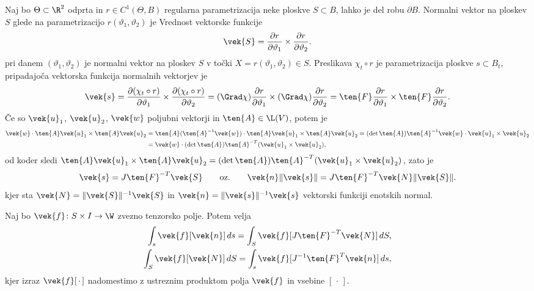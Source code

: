 Naj bo $\Theta\subset\R^2$ odprta in $r\in C^1(\Theta,B)$ regularna parametrizacija
neke ploskve $S\subset B$, lahko je del robu $\partial B$. Normalni vektor
na ploskev $S$ glede na parametrizacijo $r(\vartheta_1,\vartheta_2)$ je
Vrednost vektorske funkcije
\[
	\vek{S}=\frac{\partial r}{\partial\vartheta_1}\times
	\frac{\partial r}{\partial\vartheta_2}.
\]
pri danem $(\vartheta_1,\vartheta_2)$ je normalni vektor na ploskev $S$
v točki $X=r(\vartheta_1,\vartheta_2)\in S$.
Preslikava $\chi_t\circ r$ je parametrizacija ploskve $s\subset B_t$, pripadajoča
vektorska funkcija normalnih vektorjev je
\[
	\vek{s}=\frac{\partial(\chi_t\circ r)}{\partial\vartheta_1}\times
	\frac{\partial(\chi_t\circ r)}{\partial\vartheta_2}=
	(\Grad\chi)\frac{\partial r}{\partial\vartheta_1}\times
	(\Grad\chi)\frac{\partial r}{\partial\vartheta_2}=
	\ten{F}\frac{\partial r}{\partial\vartheta_1}\times
	\ten{F}\frac{\partial r}{\partial\vartheta_2}.
\]
Če so $\vek{u}_1$, $\vek{u}_2$, $\vek{w}$ poljubni vektorji in $\ten{A}\in\L(V)$, potem je
\begin{align*}
	\vek{w}\cdot\ten{A}\vek{u}_1\times\ten{A}\vek{u}_2&=
	\ten{A}(\ten{A}^{-1}\vek{w})\cdot\ten{A}\vek{u}_1\times\ten{A}\vek{u}_2=
	(\det\ten{A})\ten{A}^{-1}\vek{w}\cdot\vek{u}_1\times\vek{u}_2 \\
	&=\vek{w}\cdot (\det\ten{A})\ten{A}^{-T}(\vek{u}_1\times\vek{u}_2),
\end{align*}
od koder sledi $\ten{A}\vek{u}_1\times\ten{A}\vek{u}_2=
(\det\ten{A})\ten{A}^{-T}(\vek{u}_1\times\vek{u}_2)$, zato je
\begin{equation} \label{e:nsns}
	\vek{s}=J\ten{F}^{-T}\vek{S}\qquad\textrm{oz.}\qquad
	\vek{n}\|\vek{s}\|=J\ten{F}^{-T}\vek{N}\|\vek{S}\|.
\end{equation}
kjer sta $\vek{N}=\|\vek{S}\|^{-1}\vek{S}$ in $\vek{n}=\|\vek{s}\|^{-1}\vek{s}$
vektorski funkciji enotskih normal.

\begin{izrek} \label{i:suittra}
	Naj bo $\vek{f}\colon S\times I\to\W$ zvezno tenzorsko polje. Potem velja
	\begin{align*}
		\int_s\vek{f}[\vek{n}]\,ds=\int_S\vek{f}[J\ten{F}^{-T}\vek{N}]\,dS ,\\
		\int_S\vek{f}[\vek{N}]\,dS=\int_s\vek{f}[J^{-1}\ten{F}^{T}\vek{n}]\,ds,
	\end{align*}
	kjer izraz $\vek{f}[\,\cdot\,]$ nadomestimo z ustreznim produktom
	polja $\vek{f}$ in vsebine $[\,\cdot\,]$.
\end{izrek}

